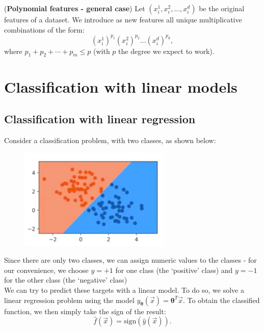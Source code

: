 \begin{frameex}
(\textbf{Polynomial features - general case}) Let $(x_i^1,x_i^2,...,x_i^d)$ be the original features of a dataset. We introduce as new features all unique multiplicative combinations of the form:
\begin{equation*}
(x_i^1)^{p_1}(x_i^2)^{p_2} ... (x_i^d)^{p_d},
\end{equation*}
where $p_1 + p_2 + \cdots + p_m \leq p$ (with $p$ the degree we expect to work).
\end{frameex}







\newpage
\section{Classification with linear models}

\subsection{Classification with linear regression}
Consider a classification problem, with two classes, as shown below:
\begin{figure}[H]
\centering
\includegraphics[scale=0.7]{classificationproblem.png}
\end{figure}
Since there are only two classes, we can assign numeric values to the classes - for our convenience, we choose $y = +1$ for one class (the `positive' class) and $y = -1$ for the other class (the `negative' class)\\

We can try to predict these targets with a linear model. To do so, we solve a linear regression problem using the model $\hat{y}_{\pmb{\theta}}(\vec{x}) = \pmb{\theta}^T\vec{x}$. To obtain the classified function, we then simply take the sign of the result:
\begin{equation*}
\hat{f}(\vec{x}) = \textrm{sign}(\hat{y}(\vec{x})).
\end{equation*}

